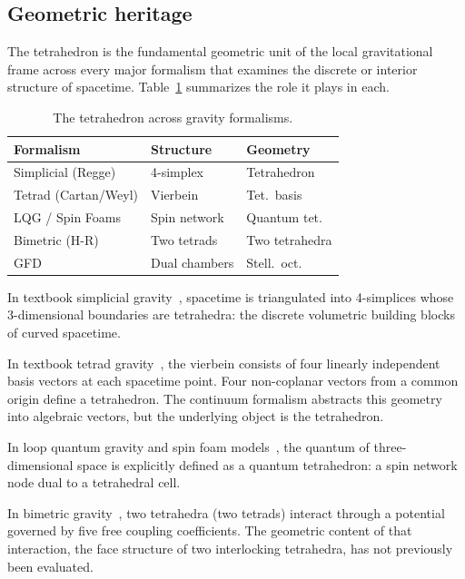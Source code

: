 \documentclass[twocolumn]{iopjournal}
\begin{document}
\subsection{Geometric heritage}

The tetrahedron is the fundamental geometric unit of the local gravitational frame across every major formalism that examines the discrete or interior structure of spacetime. Table~\ref{tab:heritage} summarizes the role it plays in each.

\begin{table}[h]
\centering
\caption{The tetrahedron across gravity formalisms.}
\label{tab:heritage}
{\small
\begin{tabular*}{\columnwidth}{@{\extracolsep{\fill}}lll@{}}
\hline
Formalism & Structure & Geometry \\
\hline
Simplicial (Regge) & 4-simplex & Tetrahedron \\
Tetrad (Cartan/Weyl) & Vierbein & Tet.\ basis \\
LQG / Spin Foams & Spin network & Quantum tet. \\
Bimetric (H-R) & Two tetrads & Two tetrahedra \\
GFD & Dual chambers & Stell.\ oct. \\
\hline
\end{tabular*}}
\end{table}

In textbook simplicial gravity~\cite{Regge1961}, spacetime is triangulated into 4-simplices whose 3-dimensional boundaries are tetrahedra: the discrete volumetric building blocks of curved spacetime.

In textbook tetrad gravity~\cite{Einstein1928,Weyl1929}, the vierbein consists of four linearly independent basis vectors at each spacetime point. Four non-coplanar vectors from a common origin define a tetrahedron. The continuum formalism abstracts this geometry into algebraic vectors, but the underlying object is the tetrahedron.

In loop quantum gravity and spin foam models~\cite{RovelliSmolin1995}, the quantum of three-dimensional space is explicitly defined as a quantum tetrahedron: a spin network node dual to a tetrahedral cell.

In bimetric gravity~\cite{HassanRosen2012a}, two tetrahedra (two tetrads) interact through a potential governed by five free coupling coefficients. The geometric content of that interaction, the face structure of two interlocking tetrahedra, has not previously been evaluated.
\end{document}

